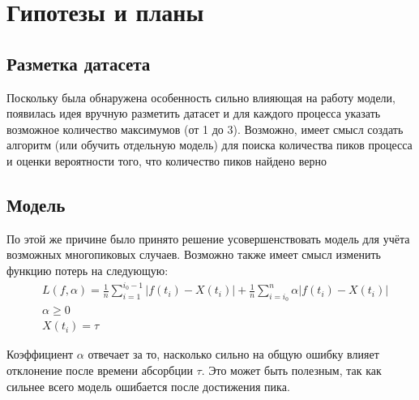 \documentclass{article}
\begin{document}
\section{Гипотезы и планы}

\subsection{Разметка датасета}

Поскольку была обнаружена особенность сильно влияющая на работу модели, появилась идея вручную разметить датасет и для каждого процесса указать возможное количество максимумов (от 1 до 3). Возможно, имеет смысл создать алгоритм (или обучить отдельную модель) для поиска количества пиков процесса и оценки вероятности того, что количество пиков найдено верно

\subsection{Модель}

По этой же причине было принято решение усовершенствовать модель для учёта возможных многопиковых случаев. Возможно также имеет смысл изменить функцию потерь на следующую:
\begin{align*}
	 & L(f, \alpha) = \frac{1}{n}\sum_{i=1}^{i_0-1} |f(t_i) - X(t_i)| +
	\frac{1}{n}\sum_{i=i_0}^{n} \alpha|f(t_i) - X(t_i)|                 \\
	 & \alpha \ge 0                                                     \\
	 & X(t_i) = \tau
\end{align*}

Коэффициент $\alpha$ отвечает за то, насколько сильно на общую ошибку влияет отклонение после времени абсорбции $\tau$. Это может быть полезным, так как сильнее всего модель ошибается после  достижения пика.
\end{document}
